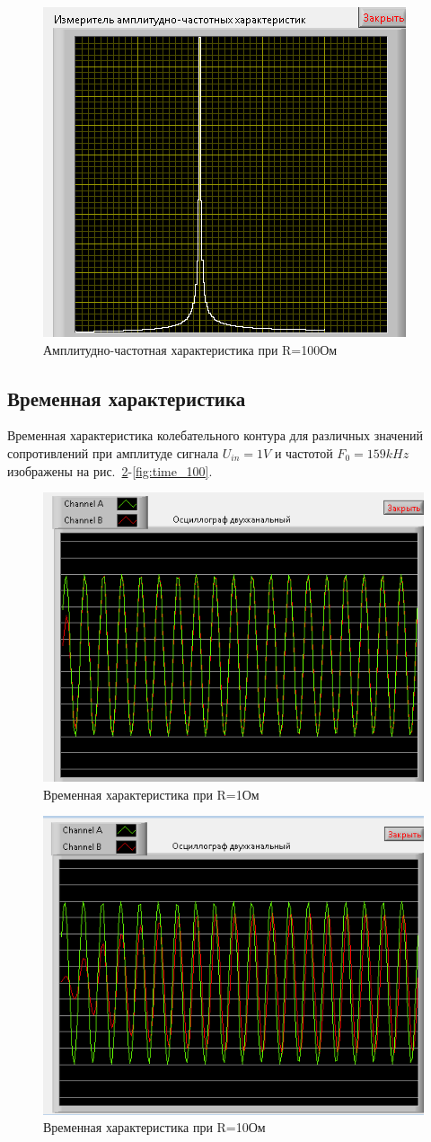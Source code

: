 \documentclass[a4paper,14pt]{article}
\begin{document}
\begin{figure}[H]
	\centering
	\includegraphics[width=0.5\linewidth]{image/afr_100}
	\caption{Амплитудно-частотная характеристика при R=100Ом}
	\label{fig:afr_100}
\end{figure}

\subsection{Временная характеристика}

Временная характеристика колебательного контура для различных значений сопротивлений при амплитуде сигнала $U_{in} = 1V$ и частотой $F_0=159kHz$ изображены на рис.~\ref{fig:time_1}-\ref{fig:time_100}.

\begin{figure}[H]
	\centering
	\includegraphics[width=0.5\linewidth]{image/time_1}
	\caption{Временная характеристика при R=1Ом}
	\label{fig:time_1}
\end{figure}

\begin{figure}[H]
	\centering
	\includegraphics[width=0.5\linewidth]{image/time_10}
	\caption{Временная характеристика при R=10Ом}
	\label{fig:time_10}
\end{figure}
\end{document}
